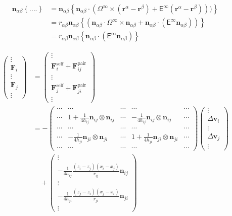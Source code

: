 \documentclass[12pt]{article}
\newcommand{\tens}[1]{\bm{\mathsf{#1}}}
\begin{document}
\begin{align*}
    \bm{n}_{\alpha\beta}    \left\{
  ....
    \right\} &= 
  \bm{n}_{\alpha\beta}
  \left\{
    \bm{n}_{\alpha\beta}  \cdot
      (
\Omega^{\infty} \times (\bm{r}^{\alpha}-\bm{r}^{\beta})
+ 
\tens{E}^{\infty}
(\bm{r}^{\alpha}-\bm{r}^{\beta}))
)
    \right\} \\
&= 
r_{\alpha\beta}
  \bm{n}_{\alpha\beta}
  \left\{
      (
\bm{n}_{\alpha\beta} \cdot \Omega^{\infty} \times \bm{n}_{\alpha\beta}
+ 
\bm{n}_{\alpha\beta} \cdot
(\tens{E}^{\infty} \bm{n}_{\alpha\beta})
)
    \right\} \\
&= 
r_{\alpha\beta}
  \bm{n}_{\alpha\beta}
  \left\{
\bm{n}_{\alpha\beta} \cdot
(\tens{E}^{\infty} \bm{n}_{\alpha\beta})
    \right\} 
\end{align*}




\begin{align}
\begin{pmatrix}
\vdots \\ \bm{F}_i \\ \vdots \\ \bm{F}_j \\  \vdots  
\end{pmatrix}
& =
\begin{pmatrix}
\vdots \\
\bm{F}_{i}^{\mathrm{self}} +  \bm{F}_{ij}^{\mathrm{pair}}  
\\ \vdots \\ 
\bm{F}_{j}^{\mathrm{self}} +  \bm{F}_{ji}^{\mathrm{pair}}  
\\  \vdots  
\end{pmatrix} \\
&=
-
\begin{pmatrix}
\cdots & \cdots & \cdots & \cdots & \cdots\\
\cdots & 1 + \frac{1}{4h_{ij}}\bm{n}_{ij} \otimes \bm{n}_{ij}  
& \cdots & -\frac{1}{4h_{ij}}\bm{n}_{ij} \otimes \bm{n}_{ij}   & \cdots\\
\cdots & \cdots & \cdots & \cdots & \cdots\\
\cdots & -\frac{1}{4h_{ji}}\bm{n}_{ji} \otimes \bm{n}_{ji} & \cdots 
& 1 + \frac{1}{4h_{ji}}\bm{n}_{ji} \otimes \bm{n}_{ji} 
 & \cdots \\
\cdots & \cdots & \cdots & \cdots & \cdots 
\end{pmatrix}
\begin{pmatrix}
\vdots \\
\Delta \bm{v}_i \\ 
\vdots \\
\Delta \bm{v}_j \\
\vdots 
\end{pmatrix} \\
& \quad 
+ 
\begin{pmatrix}
\vdots \\
-\frac{1}{4h_{ij}}
 \frac{(z_i - z_j )(x_i-x_j)}{r_{ij}} 
 \bm{n}_{ij} \\
\vdots \\
-\frac{1}{4h_{ji}} 
 \frac{(z_j - z_i )(x_j - x_i)}{r_{ji}} 
\bm{n}_{ji} \\
\vdots 
\end{pmatrix} 
\end{align}
\end{document}
